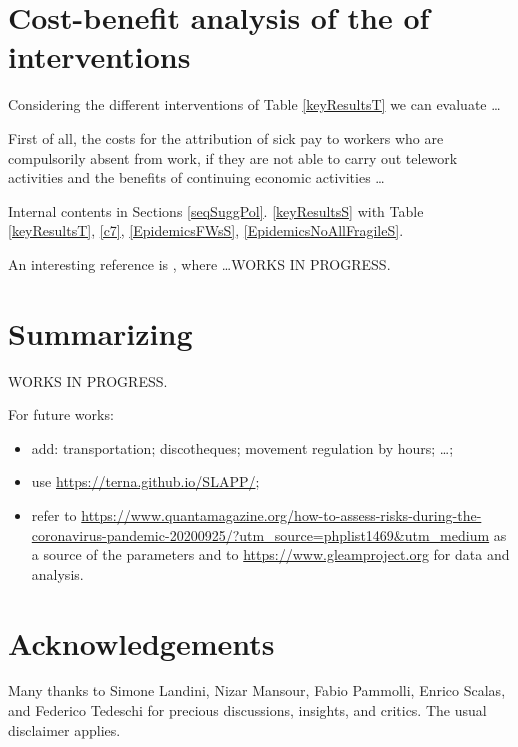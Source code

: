 \documentclass[graybox]{svmult}
\begin{document}
\section{Cost-benefit analysis of the of interventions}
\label{CBanalysis}

Considering  the different interventions of Table \ref{keyResultsT} we can evaluate \ldots

First of all, the costs for the attribution of sick pay to workers who are compulsorily absent from work, if they are not able to carry out telework activities and the benefits of continuing economic activities \ldots

Internal contents in Sections \ref{seqSuggPol}. 
\ref{keyResultsS} with Table \ref{keyResultsT}, \ref{c7}, 
\ref{EpidemicsFWsS}, 
\ref{EpidemicsNoAllFragileS}.

An interesting reference is \cite{doi:10.1111/ijcp.13674}, where \ldots WORKS IN PROGRESS.

\section{Summarizing}

WORKS IN PROGRESS.

For future works:
\begin{itemize}

\item add: transportation; discotheques; movement regulation by hours; \ldots;

\item use \url{https://terna.github.io/SLAPP/};

\item refer to \url{https://www.quantamagazine.org/how-to-assess-risks-during-the-coronavirus-pandemic-20200925/?utm_source=phplist1469&utm_medium} as a source of the parameters and to \url{https://www.gleamproject.org} for data and analysis.

\end{itemize}

\section*{Acknowledgements}

Many thanks to Simone Landini, Nizar Mansour, Fabio Pammolli, Enrico Scalas, and Federico Tedeschi for precious discussions, insights, and critics. The usual disclaimer applies.
\end{document}
